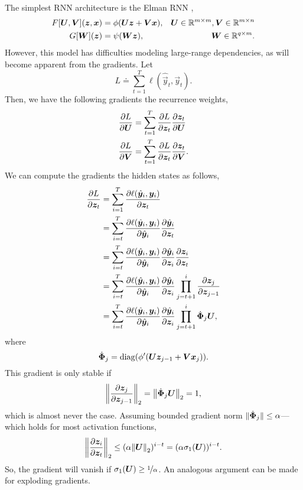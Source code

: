 The simplest RNN architecture is the Elman RNN \citep{elman1990finding},
\begin{align*}
    F[\bm{U}, \bm{V}](\bm{z}, \bm{x}) & = \phi(\bm{U} \bm{z} + \bm{V} \bm{x}), & \bm{U} \in \mathbb{R}^{m \times m}, \bm{V} \in \mathbb{R}^{m \times n} \\
    G[\bm{W}](\bm{z})                   & = \psi(\bm{W} \bm{z}),                   & \bm{W} \in \mathbb{R}^{q \times m}.
\end{align*}
However, this model has difficulties modeling large-range dependencies, as will become apparent
from the gradients. Let \[
    L \doteq \sum_{t=1}^{T} \ell(\hat{\vec{y}}_t, \vec{y}_t).
\]
Then, we have the following gradients \wrt the recurrence weights,
\begin{align*}
    \pdv{L}{\bm{U}} & = \sum_{t=1}^{T} \pdv{L}{\bm{z}_t} \pdv{\bm{z}_t}{\bm{U}}  \\
    \pdv{L}{\bm{V}} & = \sum_{t=1}^{T} \pdv{L}{\bm{z}_t} \pdv{\bm{z}_t}{\bm{V}}. \\
\end{align*}
We can compute the gradients \wrt the hidden states as follows,
\begin{align*}
    \pdv{L}{\bm{z}_t} & = \sum_{i=1}^{T} \pdv{\ell(\hat{\bm{y}}_i, \bm{y}_i)}{\bm{z}_t}                                                                                       \\
                       & = \sum_{i=t}^{T} \pdv{\ell(\hat{\bm{y}}_i, \bm{y}_i)}{\hat{\bm{y}}_i} \pdv{\hat{\bm{y}}_i}{\bm{z}_t}                                                \\
                       & = \sum_{i=t}^{T} \pdv{\ell(\hat{\bm{y}}_i, \bm{y}_i)}{\hat{\bm{y}}_i} \pdv{\hat{\bm{y}}_i}{\bm{z}_i} \pdv{\bm{z}_i}{\bm{z}_t}                     \\
                       & = \sum_{i=t}^{T} \pdv{\ell(\hat{\bm{y}}_i, \bm{y}_i)}{\hat{\bm{y}}_i} \pdv{\hat{\bm{y}}_i}{\bm{z}_i} \prod_{j=t+1}^i \pdv{\bm{z}_j}{\bm{z}_{j-1}} \\
                       & = \sum_{i=t}^{T} \pdv{\ell(\hat{\bm{y}}_i, \bm{y}_i)}{\hat{\bm{y}}_i} \pdv{\hat{\bm{y}}_i}{\bm{z}_i} \prod_{j=t+1}^i \dot{\bm{\Phi}}_j \bm{U},
\end{align*}
where \[
    \dot{\mat{\Phi}}_j = \mathrm{diag} \lft( \phi'(\mat{U} \vec{z}_{j-1} + \mat{V}\vec{x}_j) \rgt).
\]
This gradient is only stable if \[
    \lft\| \pdv{\vec{z}_j}{\vec{z}_{j-1}} \rgt\|_2 = \lft\| \dot{\mat{\Phi}}_j \mat{U} \rgt\|_2 = 1,
\]
which is almost never the case. Assuming bounded gradient norm $\| \dot{\bm{\Phi}}_j \| \leq
    \alpha$---which holds for most activation functions, \[
    \lft\| \pdv{\vec{z}_i}{\vec{z}_t} \rgt\|_2 \leq (\alpha \lft\| \mat{U} \rgt\|_2)^{i-t} = (\alpha \sigma_1(\mat{U}))^{i-t}.
\]
So, the gradient will vanish if $\sigma_1(\bm{U}) \geq \nicefrac{1}{\alpha}$. An analogous
argument can be made for exploding gradients.

